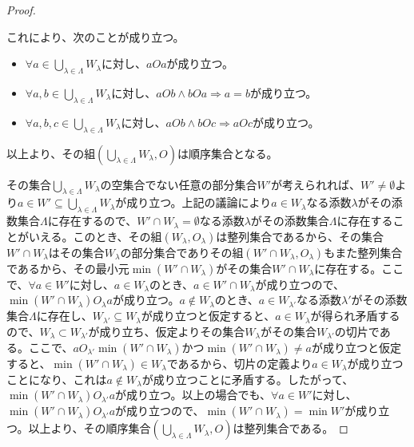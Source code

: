 \documentclass[dvipdfmx]{jsarticle}
\begin{document}
\begin{proof}
\begin{itemize}
\end{itemize}
これにより、次のことが成り立つ。
\begin{itemize}
\item
  $\forall a \in \bigcup_{\lambda \in \varLambda } W_{\lambda}$に対し、$aOa$が成り立つ。
\item
  $\forall a,b \in \bigcup_{\lambda \in \varLambda } W_{\lambda}$に対し、$aOb \land bOa \Rightarrow a = b$が成り立つ。
\item
  $\forall a,b,c \in \bigcup_{\lambda \in \varLambda } W_{\lambda}$に対し、$aOb \land bOc \Rightarrow aOc$が成り立つ。
\end{itemize}
以上より、その組$\left( \bigcup_{\lambda \in \varLambda } W_{\lambda},O \right)$は順序集合となる。\par
その集合$\bigcup_{\lambda \in \varLambda } W_{\lambda}$の空集合でない任意の部分集合$W'$が考えられれば、$W' \neq \emptyset$より$a \in W' \subseteq \bigcup_{\lambda \in \varLambda } W_{\lambda}$が成り立つ。上記の議論により$a \in W_{\lambda}$なる添数$\lambda$がその添数集合$\varLambda $に存在するので、$W' \cap W_{\lambda} = \emptyset$なる添数$\lambda$がその添数集合$\varLambda $に存在することがいえる。このとき、その組$\left( W_{\lambda},O_{\lambda} \right)$は整列集合であるから、その集合$W' \cap W_{\lambda}$はその集合$W_{\lambda}$の部分集合でありその組$\left( W' \cap W_{\lambda},O_{\lambda} \right)$もまた整列集合であるから、その最小元$\min\left( W' \cap W_{\lambda} \right)$がその集合$W' \cap W_{\lambda}$に存在する。ここで、$\forall a \in W'$に対し、$a \in W_{\lambda}$のとき、$a \in W' \cap W_{\lambda}$が成り立つので、$\min\left( W' \cap W_{\lambda} \right)O_{\lambda}a$が成り立つ。$a \notin W_{\lambda}$のとき、$a \in W_{\lambda'}$なる添数$\lambda'$がその添数集合$\varLambda $に存在し、$W_{\lambda'} \subseteq W_{\lambda}$が成り立つと仮定すると、$a \in W_{\lambda}$が得られ矛盾するので、$W_{\lambda} \subset W_{\lambda'}$が成り立ち、仮定よりその集合$W_{\lambda}$がその集合$W_{\lambda'}$の切片である。ここで、$aO_{\lambda'}\min\left( W' \cap W_{\lambda} \right)$かつ$\min\left( W' \cap W_{\lambda} \right) \neq a$が成り立つと仮定すると、$\min\left( W' \cap W_{\lambda} \right) \in W_{\lambda}$であるから、切片の定義より$a \in W_{\lambda}$が成り立つことになり、これは$a \notin W_{\lambda}$が成り立つことに矛盾する。したがって、$\min\left( W' \cap W_{\lambda} \right)O_{\lambda'}a$が成り立つ。以上の場合でも、$\forall a \in W'$に対し、$\min\left( W' \cap W_{\lambda} \right)O_{\lambda'}a$が成り立つので、$\min\left( W' \cap W_{\lambda} \right) = \min W'$が成り立つ。以上より、その順序集合$\left( \bigcup_{\lambda \in \varLambda } W_{\lambda},O \right)$は整列集合である。\par

\end{proof}
\end{document}
